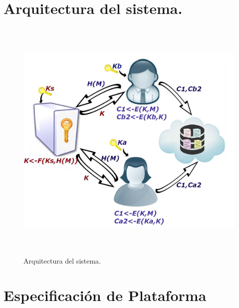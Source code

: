 

\section{Arquitectura del sistema. }
\begin{figure}[H]
\centering
	\includegraphics[width=16cm, height=12cm]{./images/Arquitectura.jpg}
	\caption{Arquitectura del sistema.}

\end{figure}







\section{Especificación de Plataforma}


